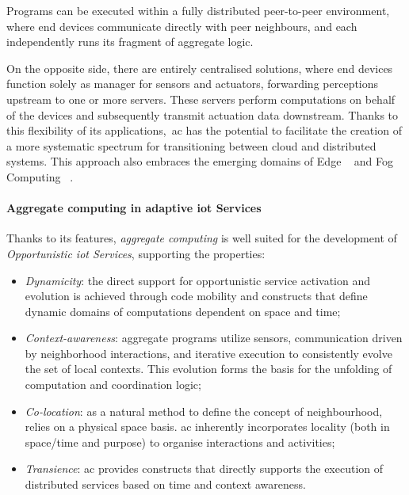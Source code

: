 Programs can be executed within a fully distributed peer-to-peer environment, where end devices communicate directly
with peer neighbours, and each independently runs its fragment of aggregate logic.

On the opposite side, there are entirely centralised solutions, where end devices function solely as manager for sensors
and actuators, forwarding perceptions upstream to one or more servers.
These servers perform computations on behalf of the devices and subsequently transmit actuation data downstream.
Thanks to this flexibility of its applications,~\ac{ac} has the potential to facilitate the creation of a more systematic
spectrum for transitioning between cloud and distributed systems.
This approach also embraces the emerging domains of Edge ~\cite{8795355} and Fog Computing ~\cite{bdcc2020010}.

\paragraph{Aggregate computing in adaptive \ac{iot} Services}
Thanks to its features, \emph{aggregate computing} is well suited for the development of \emph{Opportunistic \ac{iot}
Services}, supporting the properties:
\begin{itemize}
    \item \emph{Dynamicity}: the direct support for opportunistic service activation and evolution is achieved through
        code mobility and constructs that define dynamic domains of computations dependent on space and time;
    \item \emph{Context-awareness}: aggregate programs utilize sensors, communication driven by neighborhood interactions,
        and iterative execution to consistently evolve the set of local contexts.
        This evolution forms the basis for the unfolding of computation and coordination logic;
    \item \emph{Co-location}: as a natural method to define the concept of neighbourhood, relies on a physical space basis.
        \ac{ac} inherently incorporates locality (both in space/time and purpose) to organise interactions and activities;
    \item \emph{Transience}: \ac{ac} provides constructs that directly supports the execution of distributed services
        based on time and context awareness.
\end{itemize}

